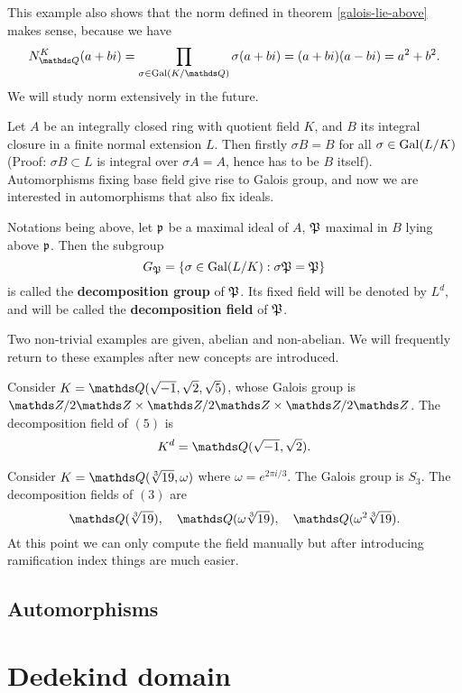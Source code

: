 		This example also shows that the norm defined in theorem \ref{galois-lie-above} makes sense, because we have
		\[
		N_{\Q}^{K}(a+bi)=\prod_{\sigma \in \gal(K/\Q)}\sigma(a+bi) = (a+bi)(a-bi)=a^2+b^2.
		\]
		We will study norm extensively in the future. %
		
		Let $A$ be an integrally closed ring with quotient field $K$, and $B$ its integral closure in a finite normal extension $L$. Then firstly $\sigma{B}=B$ for all $\sigma \in \operatorname{Gal}(L/K)$ (Proof: $\sigma{B} \subset L$ is integral over $\sigma{A}=A$, hence has to be $B$ itself). Automorphisms fixing base field give rise to Galois group, and now we are interested in automorphisms that also fix ideals. 
		
		\begin{definition}
			Notations being above, let $\mathfrak{p}$ be a maximal ideal of $A$, $\mathfrak{P}$ maximal in $B$ lying above $\mathfrak{p}$. Then the subgroup
			\[
				G_\mathfrak{P} = \{\sigma \in \operatorname{Gal}(L/K):\sigma\mathfrak{P}=\mathfrak{P}\}
			\]
			is called the \textbf{decomposition group} of $\mathfrak{P}$. Its fixed field will be denoted by $L^d$, and will be called the \textbf{decomposition field} of $\mathfrak{P}$. 
		\end{definition}
		Two non-trivial examples are given, abelian and non-abelian. We will frequently return to these examples after new concepts are introduced. 
		\begin{example}
			Consider $K = \Q(\sqrt{-1},\sqrt{2},\sqrt{5})$, whose Galois group is $\Z/2\Z \times \Z/2\Z \times \Z/2\Z$. The decomposition field of $(5)$ is
			\[
				K^d = \Q(\sqrt{-1},\sqrt{2}).
			\]
		\end{example}
		\begin{example}
			Consider $K = \Q(\sqrt[3]{19},\omega)$ where $\omega = e^{2\pi i/3}$. The Galois group is $S_3$. The decomposition fields of $(3)$ are
			\[
				\Q(\sqrt[3]{19}),\quad \Q(\omega\sqrt[3]{19}),\quad\Q(\omega^2\sqrt[3]{19}).
			\]
			At this point we can only compute the field manually but after introducing ramification index things are much easier. 
		\end{example}
		\subsection{Automorphisms}
	\section{Dedekind domain}
		
